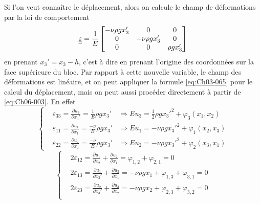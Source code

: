 Si l'on veut connaître le déplacement, alors on calcule le champ de déformations par la loi de comportement
\begin{equation}
    \underline{\underline{\varepsilon}} = \frac{1}{E} 
    \begin{bmatrix}
        -\nu \rho g x_3' & 0 & 0 \\
        0 & -\nu \rho g x_3' & 0 \\
        0 & 0 & \rho g x_3'
    \end{bmatrix}
    \label{eq:Ch06-037}
\end{equation}
en prenant $x_3'= x_3 -h$, c'est à dire en prenant l'origine des coordonnées sur la face supérieure du bloc.
Par rapport à cette nouvelle variable, le champ des déformations est linéaire, et on peut appliquer la formule \eqref{eq:Ch03-065} pour le calcul du déplacement, mais on peut aussi procéder directement à partir de \eqref{eq:Ch06-003}.
En effet
\begin{equation}
    \left\{
    \begin{aligned}
        & \varepsilon_{33} = \frac{\partial u_3}{\partial x_3'} = \frac{1}{E} \rho g x_3' &\Rightarrow E u_3 = \frac{1}{2}\rho g x_3'^2 + \varphi_3 \left( x_1, x_2 \right) \\
        & \varepsilon_{11} = \frac{\partial u_1}{\partial x_1} = \frac{-\nu}{E} \rho g x_3' &\Rightarrow E u_1 = -\nu\rho g x_3'^2 + \varphi_1 \left( x_2, x_3 \right) \\
        & \varepsilon_{22} = \frac{\partial u_2}{\partial x_2} = \frac{-\nu}{E} \rho g x_3' &\Rightarrow E u_2 = -\nu\rho g x_3'^2 + \varphi_2 \left( x_3, x_1 \right)
    \end{aligned}
    \right.
    \label{eq:Ch06-038}
\end{equation}
\begin{equation}
    \left\{
    \begin{aligned}
        & 2\varepsilon_{12} = \frac{\partial u_1}{\partial x_2} + \frac{\partial u_2}{\partial x_1} = \varphi_{1,2} + \varphi_{2,1} = 0 \\
        & 2\varepsilon_{13} = \frac{\partial u_1}{\partial x_3'} + \frac{\partial u_3}{\partial x_1} = -\nu \rho g x_1 + \varphi_{1,3} + \varphi_{3,1} = 0 \\
        & 2\varepsilon_{23} = \frac{\partial u_2}{\partial x_3'} + \frac{\partial u_3}{\partial x_2} = -\nu \rho g x_2 + \varphi_{2,3} + \varphi_{3,2} = 0 \\
    \end{aligned}
    \right.
    \label{eq:Ch06-039}
\end{equation}
